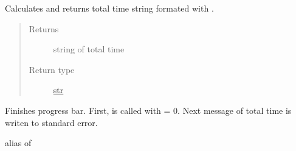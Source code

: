 \documentclass[a4paper,10pt,english]{sphinxmanual}
\begin{document}
\begin{fulllineitems}
\begin{fulllineitems}
\begin{quote}
\begin{description}
\end{description}\end{quote}

\end{fulllineitems}


\begin{fulllineitems}
\label{aqueduct.utils.clui:aqueduct.utils.clui.SimpleProgressBar.ttime}
Calculates and returns total time string formated with {\hyperref[aqueduct.utils.clui:aqueduct.utils.clui.smart_time_string]{}}.
\begin{quote}\begin{description}
\item[{Returns}] \leavevmode
string of total time

\item[{Return type}] \leavevmode
\href{https://docs.python.org/2/library/functions.html\#str}{str}

\end{description}\end{quote}

\end{fulllineitems}


\begin{fulllineitems}
\label{aqueduct.utils.clui:aqueduct.utils.clui.SimpleProgressBar.finish}
Finishes progress bar. First, {\hyperref[aqueduct.utils.clui:aqueduct.utils.clui.SimpleProgressBar.update]{}} is called with  = 0. Next message of total time
is writen to standard error.

\end{fulllineitems}


\end{fulllineitems}


\begin{fulllineitems}
\label{aqueduct.utils.clui:aqueduct.utils.clui.pbar}
alias of {\hyperref[aqueduct.utils.clui:aqueduct.utils.clui.SimpleProgressBar]{}}

\end{fulllineitems}
\end{document}
